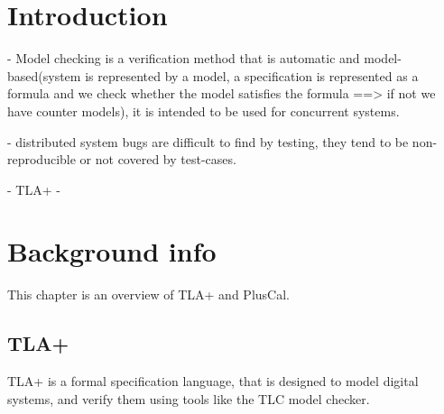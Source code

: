 \documentclass{thesul}
\begin{document}

\WritePartLabelInToc
\WriteChapterLabelInToc


\tableofcontents

\NoChapterHead


\mainmatter


\chapter{Introduction}

- Model checking is a verification method that is automatic and model-based(system is represented by a model, a specification is represented as a formula and we check whether the model satisfies the formula ==> if not we have counter models), it is intended to be used for concurrent systems.

- distributed system bugs are difficult to find by testing, they tend to be non-reproducible or not covered by test-cases.

- TLA+
- 

\chapter{Background info}

This chapter is an overview of TLA+ and PlusCal.
\section{TLA+}

TLA+ is a formal specification language, that is designed to model digital systems, and verify them using tools like the TLC model checker.
\end{document}
